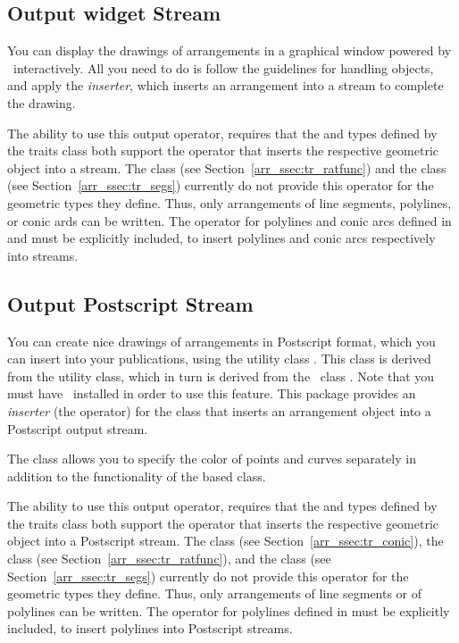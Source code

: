 \subsection{Output \qt\-widget Stream}\label{arr_ssec:qt_stream}
You can display the drawings of arrangements in a graphical window
powered by \qt\ interactively. All you need to do is follow the
guidelines for handling  objects, and apply the
{\em inserter}, which inserts an arrangement into a 
stream to complete the drawing.

The ability to use this output operator, requires that the
 and  types defined by the
traits class both support the \ccc{<<} operator that inserts the
respective geometric object into a  stream. The
 class (see
Section~\ref{arr_ssec:tr_ratfunc}) and the 
class (see Section~\ref{arr_ssec:tr_segs}) currently do not provide
this operator for the geometric types they define. Thus, only
arrangements of line segments, polylines, or conic ards can be written.
The \ccc{<<} operator for polylines and conic arcs defined in
 and
must be explicitly included, to insert polylines and conic arcs
respectively into  streams.

\subsection{Output Postscript Stream}\label{arr_ssec:ps_stream}
You can create nice drawings of arrangements in Postscript format, which
you can insert into your publications, using the utility class 
. This class is derived from the 
 utility class, which in turn is derived from
the \leda\ class . Note that you must have \leda\ installed
in order to use this feature. 
This package provides an {\em inserter} (the \ccc{<<} operator) for
the  class that inserts an arrangement
object into a Postscript output stream.

The 
class allows you to specify the color of points and curves separately
in addition to the functionality of the based class. 

The ability to use this output operator, requires that the
 and  types defined by the
traits class both support the \ccc{<<} operator that inserts the
respective geometric object into a Postscript stream. The
 class (see Section~\ref{arr_ssec:tr_conic}), the
 class (see Section~\ref{arr_ssec:tr_ratfunc}),
and the  class (see Section~\ref{arr_ssec:tr_segs})
currently do not provide this operator for the geometric types they define.
Thus, only arrangements of line segments or of polylines can be written.
The \ccc{<<} operator for polylines defined in
 must be explicitly
included, to insert polylines into Postscript streams.
